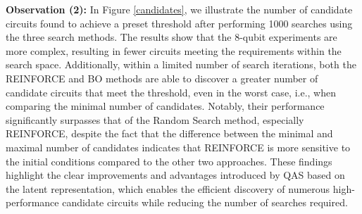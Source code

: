 \documentclass{article} %
\begin{document}
\textbf{Observation (2):} In Figure \ref{candidates}, we illustrate the number of candidate circuits found to achieve a preset threshold after performing 1000 searches using the three search methods. The results show that the 8-qubit experiments are more complex, resulting in fewer circuits meeting the requirements within the search space. Additionally, within a limited number of search iterations, both the REINFORCE and BO methods are able to discover a greater number of candidate circuits that meet the threshold, even in the worst case, i.e., when comparing the minimal number of candidates. Notably, their performance significantly surpasses that of the Random Search method, especially REINFORCE, despite the fact that the difference between the minimal and maximal number of candidates indicates that REINFORCE is more sensitive to the initial conditions compared to the other two approaches. These findings highlight the clear improvements and advantages introduced by QAS based on the latent representation, which enables the efficient discovery of numerous high-performance candidate circuits while reducing the number of searches required.
\end{document}
